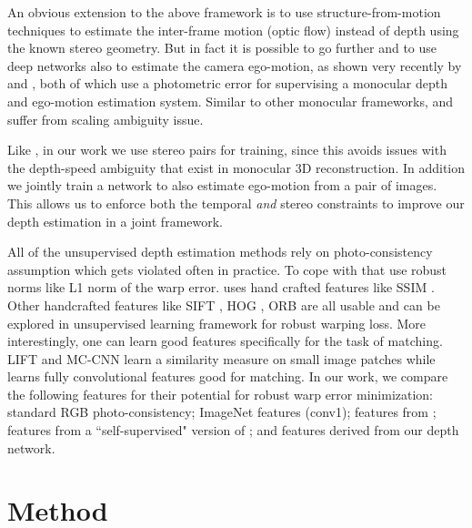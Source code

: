 \documentclass[10pt,twocolumn,letterpaper]{article}
\begin{document}
An obvious extension to the above framework is to use structure-from-motion techniques to estimate the inter-frame motion (optic flow) \cite{yu2016B2B} instead of depth using the known stereo geometry. But in fact it is possible to go further and to use deep networks also to estimate the camera ego-motion, as shown very recently by \cite{zhou2017sfmlearner} and \cite{vijayanarasimhan2017sfmnet}, both of which use a photometric error for supervising a monocular depth and ego-motion estimation system. 
Similar to other monocular frameworks, \cite{zhou2017sfmlearner} and \cite{vijayanarasimhan2017sfmnet} suffer from scaling ambiguity issue.

Like \cite{garg2016depth}\cite{godard2016depth}, in our work we use stereo pairs for training, since this avoids issues with the depth-speed ambiguity that exist in monocular 3D reconstruction. In addition we jointly train a network to also estimate ego-motion from a pair of images. This allows us to enforce both the temporal {\em and} stereo constraints to improve our depth estimation in a joint framework. 

All of the unsupervised depth estimation methods rely on photo-consistency assumption which gets violated often in practice. To cope with that \cite{garg2016depth}\cite{zhou2017sfmlearner} use robust norms like L1 norm of the warp error.
\cite{godard2016depth} uses hand crafted features like SSIM \cite{wang2004image}. Other handcrafted features like SIFT \cite{lowe2004sift}, HOG \cite{dalal2005hog}, ORB \cite{rublee2011orb} are all usable and can be explored in unsupervised learning framework for robust warping loss. 
More interestingly, one can learn good features specifically for the task of matching.
LIFT \cite{yi2016lift} and MC-CNN \cite{zbontar2016mccnn} learn a similarity measure on small image patches while \cite{weerasekera2017feature}\cite{choy2016ucn} learns fully convolutional features good for matching. 
In our work, we compare the following features for their potential for robust warp error minimization: standard RGB photo-consistency; ImageNet features (conv1); features from \cite{weerasekera2017feature}; features from a ``self-supervised" version of \cite{weerasekera2017feature}; and features derived from our depth network.




\section{Method} \label{sec:method}
\end{document}
